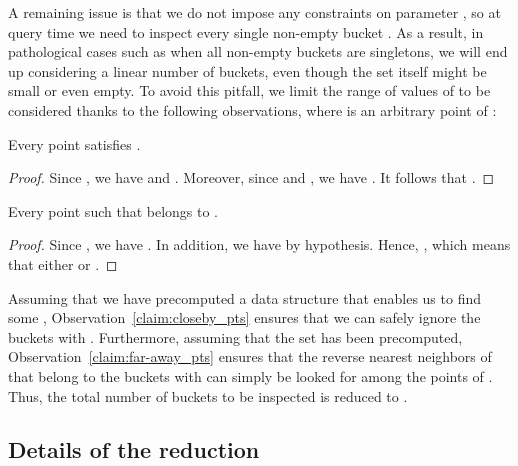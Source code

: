 A remaining issue is that we do not impose any constraints on
parameter , so at query time we need to inspect every single
non-empty bucket . As a result, in pathological cases such as
when all non-empty buckets are singletons, we will end up considering
a linear number of buckets, even though the set  itself
might be small or even empty. To avoid this pitfall, we limit the
range of values of  to be considered thanks to the following
observations, where  is an arbitrary point of :
\begin{observation}\label{claim:closeby_pts}
  Every point  satisfies .
\end{observation}
\begin{proof}
   Since , we have  and . Moreover, since  and , we
   have . It
   follows that .
 \end{proof}
\begin{observation}\label{claim:far-away_pts}
  Every point  such that  belongs to .
\end{observation}
\begin{proof}
   Since , we have . In addition, we have  by
   hypothesis. Hence, , which means that either  or .
 \end{proof}
Assuming that we have precomputed a data structure that enables us to
find some , Observation~\ref{claim:closeby_pts}
ensures that we can safely ignore the buckets  with
. Furthermore, assuming that
the set  has been precomputed,
Observation~\ref{claim:far-away_pts} ensures that the reverse
nearest neighbors of  that belong to the buckets  with
 can simply be looked for
among the points of . Thus, the total number
of buckets to be inspected is reduced to 
.


\subsection{Details of the reduction}
\label{sec:rnn_alg}

